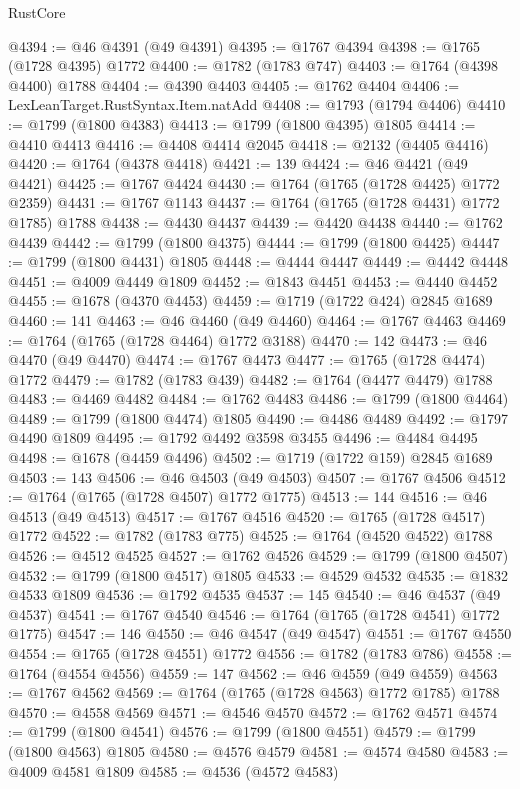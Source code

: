 \begin{lexlean}{RustCore}
\begin{coremodule}
@4394 := @46 @4391 (@49 @4391)
@4395 := @1767 @4394
@4398 := @1765 (@1728 @4395) @1772
@4400 := @1782 (@1783 @747)
@4403 := @1764 (@4398 @4400) @1788
@4404 := @4390 @4403
@4405 := @1762 @4404
@4406 := LexLeanTarget.RustSyntax.Item.natAdd
@4408 := @1793 (@1794 @4406)
@4410 := @1799 (@1800 @4383)
@4413 := @1799 (@1800 @4395) @1805
@4414 := @4410 @4413
@4416 := @4408 @4414 @2045
@4418 := @2132 (@4405 @4416)
@4420 := @1764 (@4378 @4418)
@4421 := 139
@4424 := @46 @4421 (@49 @4421)
@4425 := @1767 @4424
@4430 := @1764 (@1765 (@1728 @4425) @1772 @2359)
@4431 := @1767 @1143
@4437 := @1764 (@1765 (@1728 @4431) @1772 @1785) @1788
@4438 := @4430 @4437
@4439 := @4420 @4438
@4440 := @1762 @4439
@4442 := @1799 (@1800 @4375)
@4444 := @1799 (@1800 @4425)
@4447 := @1799 (@1800 @4431) @1805
@4448 := @4444 @4447
@4449 := @4442 @4448
@4451 := @4009 @4449 @1809
@4452 := @1843 @4451
@4453 := @4440 @4452
@4455 := @1678 (@4370 @4453)
@4459 := @1719 (@1722 @424) @2845 @1689
@4460 := 141
@4463 := @46 @4460 (@49 @4460)
@4464 := @1767 @4463
@4469 := @1764 (@1765 (@1728 @4464) @1772 @3188)
@4470 := 142
@4473 := @46 @4470 (@49 @4470)
@4474 := @1767 @4473
@4477 := @1765 (@1728 @4474) @1772
@4479 := @1782 (@1783 @439)
@4482 := @1764 (@4477 @4479) @1788
@4483 := @4469 @4482
@4484 := @1762 @4483
@4486 := @1799 (@1800 @4464)
@4489 := @1799 (@1800 @4474) @1805
@4490 := @4486 @4489
@4492 := @1797 @4490 @1809
@4495 := @1792 @4492 @3598 @3455
@4496 := @4484 @4495
@4498 := @1678 (@4459 @4496)
@4502 := @1719 (@1722 @159) @2845 @1689
@4503 := 143
@4506 := @46 @4503 (@49 @4503)
@4507 := @1767 @4506
@4512 := @1764 (@1765 (@1728 @4507) @1772 @1775)
@4513 := 144
@4516 := @46 @4513 (@49 @4513)
@4517 := @1767 @4516
@4520 := @1765 (@1728 @4517) @1772
@4522 := @1782 (@1783 @775)
@4525 := @1764 (@4520 @4522) @1788
@4526 := @4512 @4525
@4527 := @1762 @4526
@4529 := @1799 (@1800 @4507)
@4532 := @1799 (@1800 @4517) @1805
@4533 := @4529 @4532
@4535 := @1832 @4533 @1809
@4536 := @1792 @4535
@4537 := 145
@4540 := @46 @4537 (@49 @4537)
@4541 := @1767 @4540
@4546 := @1764 (@1765 (@1728 @4541) @1772 @1775)
@4547 := 146
@4550 := @46 @4547 (@49 @4547)
@4551 := @1767 @4550
@4554 := @1765 (@1728 @4551) @1772
@4556 := @1782 (@1783 @786)
@4558 := @1764 (@4554 @4556)
@4559 := 147
@4562 := @46 @4559 (@49 @4559)
@4563 := @1767 @4562
@4569 := @1764 (@1765 (@1728 @4563) @1772 @1785) @1788
@4570 := @4558 @4569
@4571 := @4546 @4570
@4572 := @1762 @4571
@4574 := @1799 (@1800 @4541)
@4576 := @1799 (@1800 @4551)
@4579 := @1799 (@1800 @4563) @1805
@4580 := @4576 @4579
@4581 := @4574 @4580
@4583 := @4009 @4581 @1809
@4585 := @4536 (@4572 @4583)

\end{coremodule}
\end{lexlean}
